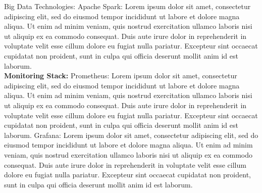 \documentclass[12pt]{article}
\begin{document}
Big Data Technologies:
Apache Spark: Lorem ipsum dolor sit amet, consectetur adipiscing elit, sed do eiusmod tempor incididunt ut labore et dolore magna aliqua. Ut enim ad minim veniam, quis nostrud exercitation ullamco laboris nisi ut aliquip ex ea commodo consequat. Duis aute irure dolor in reprehenderit in voluptate velit esse cillum dolore eu fugiat nulla pariatur. Excepteur sint occaecat cupidatat non proident, sunt in culpa qui officia deserunt mollit anim id est laborum.\\
\textbf{Monitoring Stack:}
Prometheus: Lorem ipsum dolor sit amet, consectetur adipiscing elit, sed do eiusmod tempor incididunt ut labore et dolore magna aliqua. Ut enim ad minim veniam, quis nostrud exercitation ullamco laboris nisi ut aliquip ex ea commodo consequat. Duis aute irure dolor in reprehenderit in voluptate velit esse cillum dolore eu fugiat nulla pariatur. Excepteur sint occaecat cupidatat non proident, sunt in culpa qui officia deserunt mollit anim id est laborum.
Grafana: Lorem ipsum dolor sit amet, consectetur adipiscing elit, sed do eiusmod tempor incididunt ut labore et dolore magna aliqua. Ut enim ad minim veniam, quis nostrud exercitation ullamco laboris nisi ut aliquip ex ea commodo consequat. Duis aute irure dolor in reprehenderit in voluptate velit esse cillum dolore eu fugiat nulla pariatur. Excepteur sint occaecat cupidatat non proident, sunt in culpa qui officia deserunt mollit anim id est laborum.

\newpage %
\end{document}
